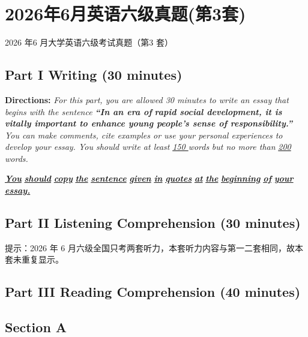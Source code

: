 \documentclass[UTF8,11pt]{ctexart}
\begin{document}
\section*{2026年6月英语六级真题(第3套)}
2026 年6 月大学英语六级考试真题（第3 套）


\subsection*{\textbf{Part I Writing} \textbf{(30 minutes)}}


\textbf{Directions:}\textit{ For this part, you are allowed 30 minutes to write an essay that begins with the sentence }\textbf{\textit{“In an era of}} \textbf{\textit{rapid social development, it is vitally important to enhance young people’s sense of responsibility.”}}\textit{ You can make} \textit{comments, cite examples or use your personal experiences to develop your essay. You should write at least }\textit{\uline{150 }}\textit{words} \textit{but no more than }\textit{\uline{200 }}\textit{words.}


\textbf{\textit{\uline{You}}}\textbf{\textit{ }}\textbf{\textit{\uline{should}}}\textbf{\textit{ }}\textbf{\textit{\uline{copy}}}\textbf{\textit{ }}\textbf{\textit{\uline{the}}}\textbf{\textit{ }}\textbf{\textit{\uline{sentence}}}\textbf{\textit{ }}\textbf{\textit{\uline{given}}}\textbf{\textit{ }}\textbf{\textit{\uline{in}}}\textbf{\textit{ }}\textbf{\textit{\uline{quotes}}}\textbf{\textit{ }}\textbf{\textit{\uline{at}}}\textbf{\textit{ }}\textbf{\textit{\uline{the}}}\textbf{\textit{ }}\textbf{\textit{\uline{beginning}}}\textbf{\textit{ }}\textbf{\textit{\uline{of}}}\textbf{\textit{ }}\textbf{\textit{\uline{your}}}\textbf{\textit{ }}\textbf{\textit{\uline{essay.}}}


\subsection*{\textbf{Part II} \textbf{Listening Comprehension} \textbf{(30 minutes)}}


提示：2026 年 6 月六级全国只考两套听力，本套听力内容与第一二套相同，故本套未重复显示。


\subsection*{\textbf{Part III Reading Comprehension (40 minutes)}}


\subsection*{\textbf{Section A}}
\end{document}
